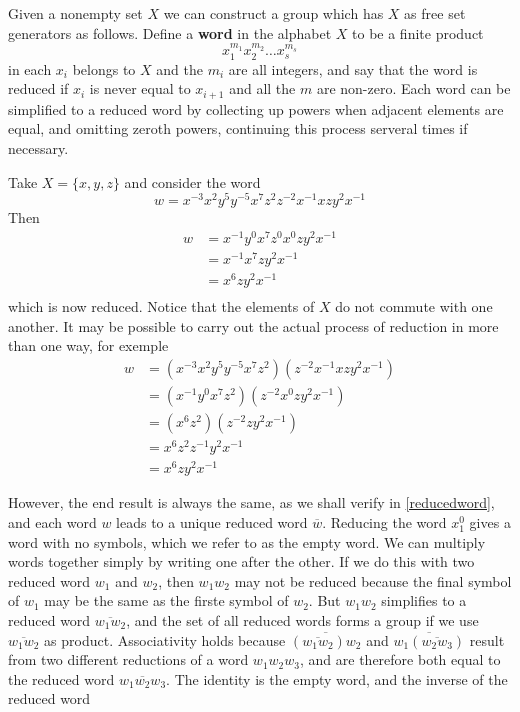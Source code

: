 \begin{definition}
    Given a nonempty set $X$  we can construct a group which has $X$ as free set generators as follows.
    Define a \textbf{word} in the alphabet $X$ to be a finite product
    \begin{equation*}
        x_1^{m_1}x_2^{m_2}\dotsc x_s^{m_s}
    \end{equation*}
    in each $x_i$ belongs to $X$ and the $m_i$ are all integers, and say that the word is reduced if $x_i$ is never equal to $x_{i+1}$ and all the $m$ are non-zero. Each word can be simplified to a reduced word
    by collecting up powers when adjacent elements are equal, and omitting zeroth powers, continuing  this
    process serveral times if necessary.
\end{definition}

\begin{exemple}
    Take $X=\{x,y,z\}$ and consider the word
    \begin{equation*}
        w=x^{-3}x^2y^5y^{-5}x^7z^2z^{-2}x^{-1}xzy^2x^{-1}
    \end{equation*}
    Then 
    \begin{align*}
        w&=x^{-1}y^0x^7z^0x^0zy^2x^{-1}\\
        &= x^{-1}x^7zy^2x^{-1}\\
        &= x^6zy^2x^{-1}\\
    \end{align*}
    which is now reduced. Notice that the elements of $X$ do not commute with one another. It may be possible to carry out the actual process of reduction in more than one way, for exemple
    \begin{align*}
         w&=(x^{-3}x^2y^5y^{-5}x^7z^2)(z^{-2}x^{-1}xzy^2x^{-1})\\
         &=(x^{-1}y^0x^7z^2)(z^{-2}x^0zy^2x^{-1})\\
         &=(x^6z^2)(z^{-2}zy^2x^{-1})\\
         &=x^6z^2z^{-1}y^2x^{-1}\\
         &=x^6zy^2x^{-1}
    \end{align*}
\end{exemple}
 However, the end result is always the same, as we shall verify in \ref{reducedword}, and each word $w$ leads to a unique reduced word $\overline{w}$. Reducing the word $x_1^0$ gives a word with no symbols, which we refer to as the empty word. We can multiply words together simply by writing one after the other. If we do this with two reduced word $w_1$ and $w_2$, then $w_1w_2$ may not be reduced because the final symbol of $w_1$ may be the same as the firste symbol of $w_2$. But $w_1w_2$ simplifies to a reduced word $\overline{w_1w_2}$, and the set of all reduced words forms a group if we use $\overline{w_1w_2}$ as product. Associativity holds because $\overline{(\overline{w_1w_2})w_2}$ and $\overline{w_1(\overline{w_2w_3})}$ result from two different reductions of a word $w_1w_2w_3$, and are therefore both equal to the reduced word $\overline{w_1w_2w_3}$. The identity is the empty word, and the inverse of the reduced word
